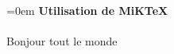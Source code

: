\documentclass{article}
\begin{document}
\parindent=0em
\textbf{Utilisation de MiKTeX} \\ \\
Bonjour tout le monde
\end{document}
